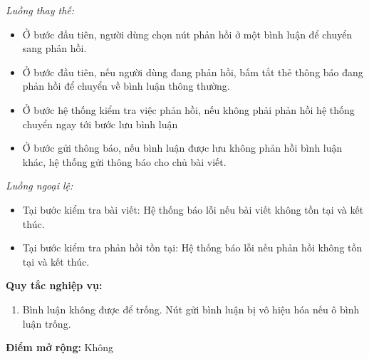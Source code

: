 \documentclass[../main.tex]{subfiles}
\begin{document}
\noindent
\textit{Luồng thay thế:}

\begin{itemize}
    \item Ở bước đầu tiên, người dùng chọn nút phản hồi ở một bình luận để chuyển sang phản hồi.
    \item Ở bước đầu tiên, nếu người dùng đang phản hồi, bấm tắt thẻ thông báo đang phản hồi để chuyển về bình luận thông thường.
    \item Ở bước hệ thống kiểm tra việc phản hồi, nếu không phải phản hồi hệ thống chuyển ngay tới bước lưu bình luận
    \item Ở bước gửi thông báo, nếu bình luận được lưu không phản hồi bình luận khác, hệ thống gửi thông báo cho chủ bài viết.
\end{itemize}

\noindent
\textit{Luồng ngoại lệ:}

\begin{itemize}
  \item Tại bước kiểm tra bài viết: Hệ thống báo lỗi nếu bài viết không tồn tại và kết thúc.
  \item Tại bước kiểm tra phản hồi tồn tại: Hệ thống báo lỗi nếu phản hồi không tồn tại và kết thúc.
\end{itemize}

\noindent
\textbf{Quy tắc nghiệp vụ:}
\begin{enumerate}[label=BR\arabic{*}.]
  \item Bình luận không được để trống. Nút gửi bình luận bị vô hiệu hóa nếu ô bình luận trống.
\end{enumerate}

\noindent
\textbf{Điểm mở rộng:} Không
\end{document}
